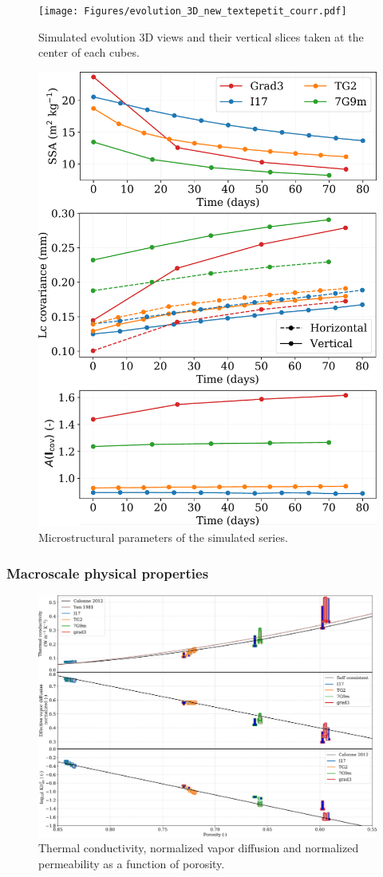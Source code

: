 \documentclass[draft,ms]{agujournal2019}
\begin{document}
\begin{figure}
    \centering
    \texttt{[image: Figures/evolution\_3D\_new\_textepetit\_courr.pdf]}
    \caption{Simulated evolution 3D views and their vertical slices taken at the center of each cubes.}
    \label{fig:evolutions_3D}
\end{figure}

\begin{figure}
    \centering
    \includegraphics[width=0.6\linewidth]{Figures/4_images_microstructure.pdf}
    \caption{Microstructural parameters of the simulated series.}
    \label{fig:4_images_microstruct}
\end{figure}


\subsubsection{Macroscale physical properties}

\begin{figure}
    \centering
    \includegraphics[width=\linewidth]{Figures/T_plot_new_long_colle.pdf}
    \caption{Thermal conductivity, normalized vapor diffusion and normalized permeability as a function of porosity.}
    \label{fig:Tplot}
\end{figure}
\end{document}
